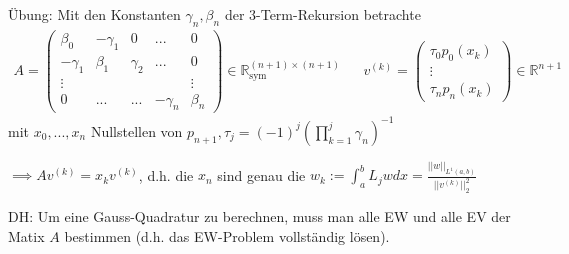 Übung: Mit den Konstanten $\gamma_n, \beta_n$ der 3-Term-Rekursion betrachte
\begin{align*}
	A = \left(\begin{matrix}
		\beta_0   & -\gamma_1 & 0 & ... & 0\\
		-\gamma_1 & \beta_1   & \gamma_2 & ... & 0\\
		\vdots    & & & & \vdots \\
		0         & ... & ... & -\gamma_n & \beta_n
	\end{matrix}\right) \in \mathbb{R}^{(n+1)\times(n+1)}_{\text{sym}} &&
	v^{(k)} = \left(\begin{matrix}
		\tau_0 p_0(x_k)\\ \vdots\\ \tau_n p_n(x_k)
	\end{matrix}\right) \in \mathbb{R}^{n+1}
\end{align*}
mit $x_0, ..., x_n$ Nullstellen von $p_{n+1}, \tau_j = (-1)^j \left(\prod_{k=1}^{j} \gamma_n\right)^{-1}$

$\implies Av^{(k)} = x_k v^{(k)}$, d.h. die $x_n$ sind genau die $w_k := \int_{a}^{b} L_j w dx = \frac{||w||_{L^1(a,b)}}{||v^{(k)}||^2_2}$

DH: Um eine Gauss-Quadratur zu berechnen, muss man alle EW und alle EV der Matix $A$ bestimmen (d.h. das EW-Problem vollständig lösen).
